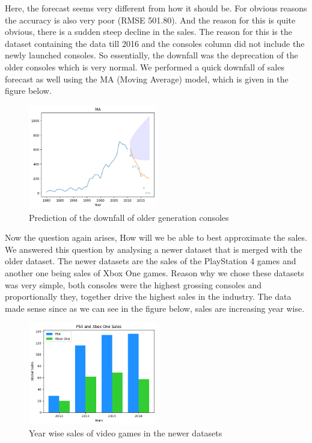 \documentclass[conference]{IEEEtran}
\begin{document}
Here, the forecast seems very different from how it should be. For obvious reasons the accuracy is also very poor (RMSE 501.80). And the reason for this is quite obvious, there is a sudden steep decline in the sales. The reason for this is the dataset containing the data till 2016 and the consoles column did not include the newly launched consoles. So essentially, the downfall was the deprecation of the older consoles which is very normal. We performed a quick downfall of sales forecast as well using the MA (Moving Average) model, which is given in the figure below.\\
\begin{figure}[h]
    \centering
    \includegraphics[width=0.5\textwidth]{downfall pred.png}
    \caption{Prediction of the downfall of older generation consoles}
\end{figure}
Now the question again arises, How will we be able to best approximate the sales. We answered this question by analysing a newer dataset that is merged with the older dataset. The newer datasets are the sales of the PlayStation 4 games and another one being sales of Xbox One games. Reason why we chose these datasets was very simple, both consoles were the highest grossing consoles and proportionally they, together drive the highest sales in the industry. The data made sense since as we can see in the figure below, sales are increasing year wise.\\
\begin{figure}[h]
    \centering
    \includegraphics[width=0.5\textwidth]{merged.png}
    \caption{Year wise sales of video games in the newer datasets}
\end{figure}
\end{document}
